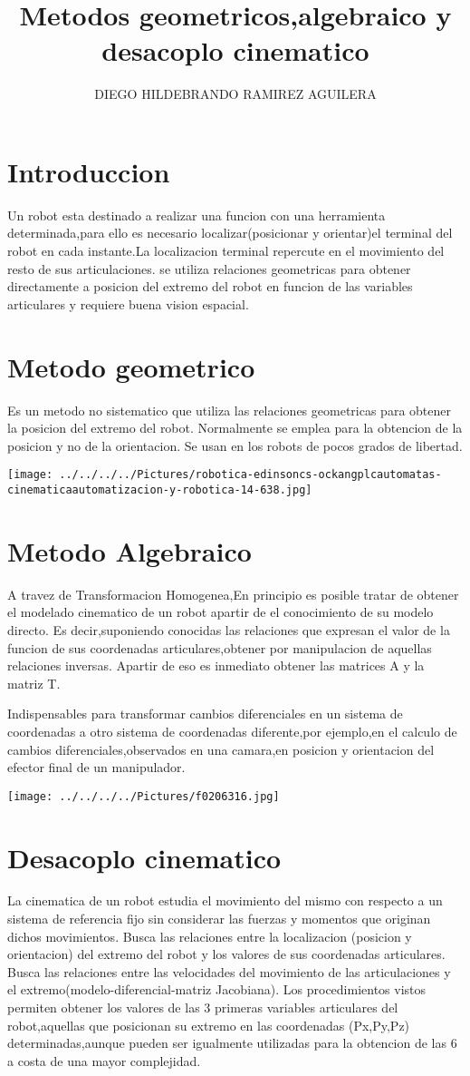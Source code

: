 \documentclass[12pt,a4paper]{article}
\author{DIEGO HILDEBRANDO RAMIREZ AGUILERA}
\title{Metodos geometricos,algebraico y desacoplo cinematico}
\begin{document}
\maketitle
\section{Introduccion}
Un robot esta destinado a realizar una funcion con una herramienta determinada,para ello es necesario localizar(posicionar y orientar)el terminal del robot en cada instante.La localizacion terminal repercute en el movimiento del resto de sus articulaciones.
se utiliza relaciones geometricas para obtener directamente a posicion del extremo del robot en funcion de las variables articulares y requiere buena vision espacial.
\section{Metodo geometrico}
Es un metodo no sistematico que utiliza las relaciones geometricas para obtener la posicion del extremo del robot.
Normalmente se emplea para la obtencion de la posicion y no de la orientacion.
Se usan en los robots de pocos grados de libertad.


\texttt{[image: ../../../../Pictures/robotica-edinsoncs-ockangplcautomatas-cinematicaautomatizacion-y-robotica-14-638.jpg]} 
\section{Metodo Algebraico}
A travez de Transformacion Homogenea,En principio es posible tratar de obtener el modelado cinematico de un robot apartir de el conocimiento de su modelo directo.
Es decir,suponiendo conocidas las relaciones que expresan el valor de la funcion de sus coordenadas articulares,obtener por manipulacion de aquellas relaciones inversas.
Apartir de eso es inmediato obtener las matrices A y la matriz T.

Indispensables para transformar cambios diferenciales en un sistema de coordenadas a otro sistema de coordenadas diferente,por ejemplo,en el calculo de cambios diferenciales,observados en una camara,en posicion y orientacion del efector final de un manipulador.

\texttt{[image: ../../../../Pictures/f0206316.jpg]} 

\section{Desacoplo cinematico}
La cinematica de un robot estudia el movimiento del mismo con respecto a un sistema de referencia fijo sin considerar las fuerzas y momentos que originan dichos movimientos.
Busca las relaciones entre la localizacion (posicion y orientacion) del extremo del robot y los valores de sus coordenadas articulares.
Busca las relaciones entre las velocidades del movimiento de las articulaciones y el extremo(modelo-diferencial-matriz Jacobiana).
Los procedimientos vistos permiten obtener los valores de las 3 primeras variables articulares del robot,aquellas que posicionan su extremo en las coordenadas (Px,Py,Pz) determinadas,aunque pueden ser igualmente utilizadas para la obtencion de las 6 a costa de una mayor complejidad.
\end{document}
